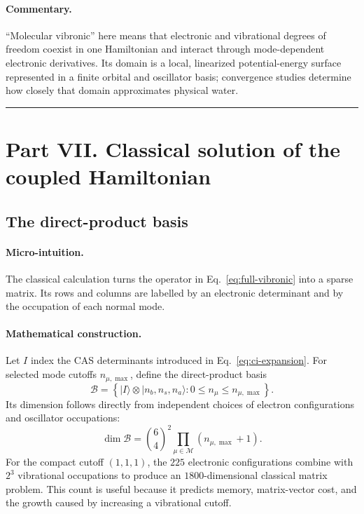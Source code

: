 \documentclass[10pt,twocolumn]{article}
\newcommand{\ket}[1]{\lvert #1\rangle}
\newcommand{\conceptbreak}{%
  \par\medskip\noindent
  {\color{black!30}\rule{\columnwidth}{0.35pt}}%
  \par\medskip}
\newcommand{\micro}{\paragraph{Micro-intuition.}}
\newcommand{\mathderiv}{\paragraph{Mathematical construction.}}
\newcommand{\commentaryblock}{\paragraph{Commentary.}}
\begin{document}
\commentaryblock ``Molecular vibronic'' here means that electronic and
vibrational degrees of freedom coexist in one Hamiltonian and interact through
mode-dependent electronic derivatives.  Its domain is a local, linearized
potential-energy surface represented in a finite orbital and oscillator basis;
convergence studies determine how closely that domain approximates physical
water.

\conceptbreak

\section*{Part VII. Classical solution of the coupled Hamiltonian}

\subsection*{The direct-product basis}

\micro The classical calculation turns the operator in
Eq.~\eqref{eq:full-vibronic} into a sparse matrix.  Its rows and columns are
labelled by an electronic determinant and by the occupation of each normal
mode.

\mathderiv Let $I$ index the CAS determinants introduced in
Eq.~\eqref{eq:ci-expansion}.  For selected mode cutoffs $n_{\mu,\max}$, define
the direct-product basis
\begin{equation}
\mathcal B=\left\{
\ket{I}\otimes\ket{n_b,n_s,n_a}:
0\le n_\mu\le n_{\mu,\max}
\right\}.
\label{eq:direct-product-basis}
\end{equation}
Its dimension follows directly from independent choices of electron
configurations and oscillator occupations:
\begin{equation}
\dim\mathcal B=\binom64^2
\prod_{\mu\in\mathcal M}(n_{\mu,\max}+1).
\label{eq:coupled-dimension}
\end{equation}
For the compact cutoff $(1,1,1)$, the $225$ electronic configurations combine
with $2^3$ vibrational occupations to produce an $1800$-dimensional classical
matrix problem.  This count is useful because it predicts memory, matrix-vector
cost, and the growth caused by increasing a vibrational cutoff.
\end{document}
